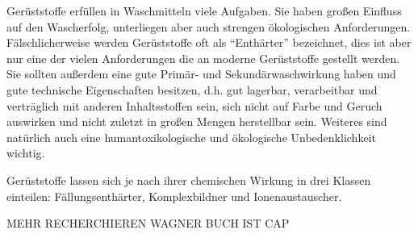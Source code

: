 \documentclass[main.tex]{subfiles}
\begin{document}
Gerüststoffe erfüllen in Waschmitteln viele Aufgaben. Sie haben großen Einfluss auf den Wascherfolg, unterliegen aber auch strengen ökologischen Anforderungen. Fälschlicherweise werden Gerüststoffe oft als "`Enthärter"' bezeichnet, dies ist aber nur eine der vielen Anforderungen die an moderne Gerüststoffe gestellt werden. Sie sollten außerdem eine gute Primär- und Sekundärwaschwirkung haben und gute technische Eigenschaften besitzen, d.h. gut lagerbar, verarbeitbar und verträglich mit anderen Inhaltsstoffen sein, sich nicht auf Farbe und Geruch auswirken und nicht zuletzt in großen Mengen herstellbar sein. Weiteres sind natürlich auch eine humantoxikologische und ökologische Unbedenklichkeit wichtig.

Gerüststoffe lassen sich je nach ihrer chemischen Wirkung in drei Klassen einteilen: Fällungsenthärter, Komplexbildner und Ionenaustauscher.

MEHR RECHERCHIEREN WAGNER BUCH IST CAP
\end{document}
